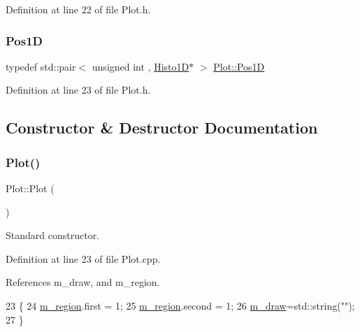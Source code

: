 Definition at line 22 of file Plot.\+h.

\mbox{\label{classPlot_ac411abcbcce315d4e77094393e6ca418}} 
\subsubsection{\texorpdfstring{Pos1D}{Pos1D}}
{\footnotesize\ttfamily typedef std\+::pair$<$ unsigned int , \hyperlink{classHisto1D}{Histo1D}$\ast$ $>$ \hyperlink{classPlot_ac411abcbcce315d4e77094393e6ca418}{Plot\+::\+Pos1D}\hspace{0.3cm}{\ttfamily [private]}}



Definition at line 23 of file Plot.\+h.



\subsection{Constructor \& Destructor Documentation}
\mbox{\label{classPlot_ae8dca35f270d0964aac1e4ff42259129}} 
\subsubsection{\texorpdfstring{Plot()}{Plot()}\hspace{0.1cm}{\footnotesize\ttfamily [1/2]}}
{\footnotesize\ttfamily Plot\+::\+Plot (\begin{DoxyParamCaption}{ }\end{DoxyParamCaption})}



Standard constructor. 



Definition at line 23 of file Plot.\+cpp.



References m\+\_\+draw, and m\+\_\+region.


\begin{DoxyCode}
23              \{
24   \hyperlink{classPlot_aabcbba1cfc66babcbcd647fdf90cdbf1}{m\_region}.first  = 1;
25   \hyperlink{classPlot_aabcbba1cfc66babcbcd647fdf90cdbf1}{m\_region}.second = 1;
26   \hyperlink{classPlot_a83ffbf3effe6a2f8befa6375882f3994}{m\_draw}=std::string(\textcolor{stringliteral}{""});
27 \}
\end{DoxyCode}
\mbox{\label{classPlot_a4e89bc6ea1800ba9697c9e0a0dc50a2e}} 

